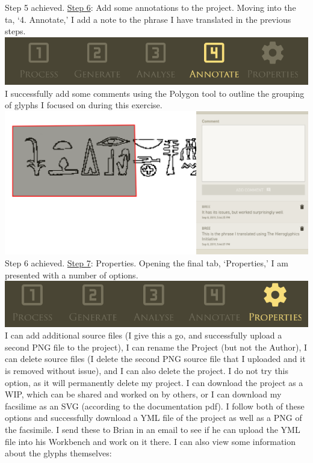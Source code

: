 \documentclass{article}
\begin{document}
\newline \break \noindent
Step 5 achieved.
\newpage \break \noindent
\underline{Step 6}: Add some annotations to the project. Moving into the  ta, `4. Annotate,' I add a note to the phrase I have translated in the previous steps.
\newline \break
\includegraphics[width=1.0\textwidth]{hiero_17.PNG}
\break \noindent
I successfully add some comments using the Polygon tool to outline the grouping of glyphs I focused on during this exercise.
\newline \break
\includegraphics[width=1.0\textwidth]{hiero_18.PNG}
\break \noindent
Step 6 achieved.
\newline \break \noindent
\underline{Step 7}: Properties. Opening the final tab, `Properties,' I am presented with a number of options.
\newline \break
\includegraphics[width=1.0\textwidth]{hiero_20.PNG}
\break \noindent
I can add additional source files (I give this a go, and successfully upload a second PNG file to the project), I can rename the Project (but not the Author), I can delete source files (I delete the second PNG source file that I uploaded and it is removed without issue), and I can also delete the project. I do not try this option, as it will permanently delete my project. I can download the project as a WIP, which can be shared and worked on by others, or I can download my facsilime as an SVG (according to the documentation pdf). I follow both of these options and successfully download a YML file of the project as well as a PNG of the facsimile. I send these to Brian in an email to see if he can upload the YML file into his Workbench and work on it there. I can also view some information about the glyphs themselves:
\end{document}
